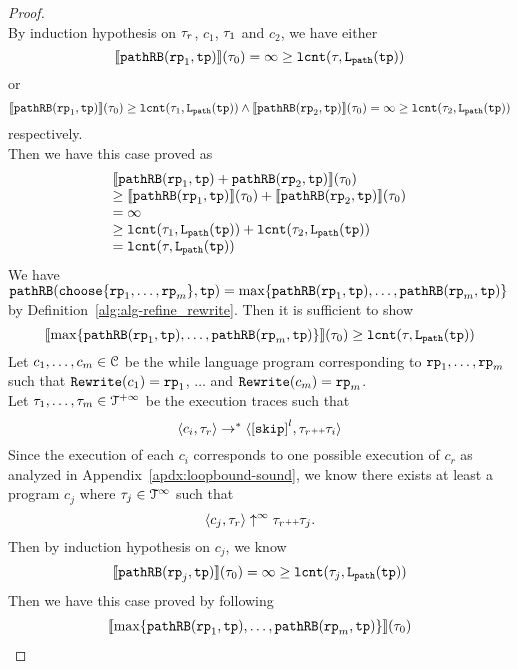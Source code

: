 \begin{proof}
\[\]
By induction hypothesis on $\mathtt{\tau}_r$, $c_1$, $\mathtt{\tau}_1$ and $c_2$, we have
either 
\[
  \llbracket \mathtt{pathRB}(\mathtt{rp}_1, \mathtt{tp}) \rrbracket(\mathtt{\tau}_0) = \infty \geq \mathtt{lcnt}(\mathtt{\tau},  \mathtt{L}_{\mathtt{path}}(\mathtt{tp})) 
\]
or
\[
  \llbracket \mathtt{pathRB}(\mathtt{rp}_1, \mathtt{tp}) \rrbracket(\mathtt{\tau}_0) \geq \mathtt{lcnt}(\mathtt{\tau}_1,  \mathtt{L}_{\mathtt{path}}(\mathtt{tp})) 
  \land 
  \llbracket \mathtt{pathRB}(\mathtt{rp}_2, \mathtt{tp}) \rrbracket(\mathtt{\tau}_0)  = \infty \geq \mathtt{lcnt}(\mathtt{\tau}_2,  \mathtt{L}_{\mathtt{path}}(\mathtt{tp}))  
\]
respectively.
\\
Then we have this case proved as
\[
  \begin{array}{l}
  \llbracket \mathtt{pathRB}(\mathtt{rp}_1, \mathtt{tp}) + \mathtt{pathRB}(\mathtt{rp}_2, \mathtt{tp}) \rrbracket(\mathtt{\tau}_0)
  \\
  \geq \llbracket \mathtt{pathRB}(\mathtt{rp}_1, \mathtt{tp}) \rrbracket(\mathtt{\tau}_0) + \llbracket \mathtt{pathRB}(\mathtt{rp}_2, \mathtt{tp}) \rrbracket(\mathtt{\tau}_0)
  \\
  =  \infty
  \\
  \geq \mathtt{lcnt}(\mathtt{\tau}_1,  \mathtt{L}_{\mathtt{path}}(\mathtt{tp}))  + \mathtt{lcnt}(\mathtt{\tau}_2,  \mathtt{L}_{\mathtt{path}}(\mathtt{tp})) 
  \\
  = \mathtt{lcnt}(\mathtt{\tau}, \mathtt{L}_{\mathtt{path}}(\mathtt{tp}))
  \end{array}
  \] 
We have $\inoutB(\rpchoose{\rprog_1, \ldots, \rprog_m }, \tpath) = \max\left\{ \inoutB(\rprog_1, \tpath), \ldots, \inoutB(\rprog_m, \tpath) \right\}$ by Definition~\ref{alg:alg-refine_rewrite}.
Then it is sufficient to show
\[
  \econfig{\max\left\{ \inoutB(\rprog_1, \tpath), \ldots, \inoutB(\rprog_m, \tpath) \right\}}(\trace_0) \geq \lcounter(\trace, \pathl(\tpath)) 
\]
Let $c_1, \ldots, c_m \in \mathcal{C}$ be the while language program corresponding to $\mathtt{rp}_1, \ldots, \mathtt{rp}_m$ such that $\mathtt{Rewrite}(c_1) = \mathtt{rp}_1$, $\ldots$ and  $\mathtt{Rewrite}(c_m) = \mathtt{rp}_m$.
\\
Let $\mathtt{\tau}_1, \ldots, \mathtt{\tau}_m \in \mathcal{T}^{+\infty}$ be the execution traces such that 
\[
  \config{c_i, \trace_r} \to^* 
  \config{\clabel{\eskip}^{l}, \trace_r \tracecat \trace_i}
\]
Since the execution of each $c_i$ corresponds to one possible execution of $c_r$ as analyzed in Appendix~\ref{apdx:loopbound-sound}, we know there exists at least a program $c_j$ where $\mathtt{\tau}_j \in \mathcal{T}^{\infty}$ such that
\[
  \langle c_j, \mathtt{\tau}_r \rangle \uparrow^{\infty} \mathtt{\tau}_r {\scriptscriptstyle ++} \mathtt{\tau}_j.
\]
Then by induction hypothesis on $c_j$, we know 
\[
  \llbracket \mathtt{pathRB}(\mathtt{rp}_j, \mathtt{tp}) \rrbracket(\mathtt{\tau}_0) = \infty
  \geq \mathtt{lcnt}(\mathtt{\tau}_j, \mathtt{L}_{\mathtt{path}}(\mathtt{tp})) 
\]
Then we have this case proved by following
\[
  \begin{array}{l}
    \econfig{\max\left\{ \inoutB(\rprog_1, \tpath), \ldots, \inoutB(\rprog_m, \tpath) \right\}}(\trace_0)

\end{array}\]
\end{proof}

